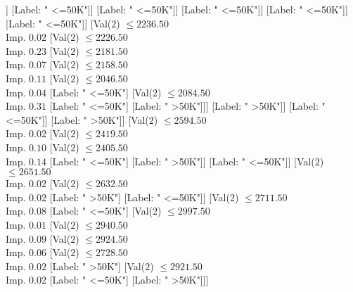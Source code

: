 \documentclass[margin=10pt]{standalone}
\begin{document}
\begin{forest}
																									[Label: " <=50K"]]
																								[Label: " <=50K"]]
																							[Label: " <=50K"]]
																						[Label: " <=50K"]]
																					[Label: " <=50K"]]
																				[Label: " <=50K"]]
																			[Val($2$) $ \leq 2236.50$ \\ Imp. $0.02$
																				[Val($2$) $ \leq 2226.50$ \\ Imp. $0.23$
																					[Val($2$) $ \leq 2181.50$ \\ Imp. $0.07$
																						[Val($2$) $ \leq 2158.50$ \\ Imp. $0.11$
																							[Val($2$) $ \leq 2046.50$ \\ Imp. $0.04$
																								[Label: " <=50K"]
																								[Val($2$) $ \leq 2084.50$ \\ Imp. $0.31$
																									[Label: " <=50K"]
																									[Label: " >50K"]]]
																							[Label: " >50K"]]
																						[Label: " <=50K"]]
																					[Label: " >50K"]]
																				[Val($2$) $ \leq 2594.50$ \\ Imp. $0.02$
																					[Val($2$) $ \leq 2419.50$ \\ Imp. $0.10$
																						[Val($2$) $ \leq 2405.50$ \\ Imp. $0.14$
																							[Label: " <=50K"]
																							[Label: " >50K"]]
																						[Label: " <=50K"]]
																					[Val($2$) $ \leq 2651.50$ \\ Imp. $0.02$
																						[Val($2$) $ \leq 2632.50$ \\ Imp. $0.02$
																							[Label: " >50K"]
																							[Label: " <=50K"]]
																						[Val($2$) $ \leq 2711.50$ \\ Imp. $0.08$
																							[Label: " <=50K"]
																							[Val($2$) $ \leq 2997.50$ \\ Imp. $0.01$
																								[Val($2$) $ \leq 2940.50$ \\ Imp. $0.09$
																									[Val($2$) $ \leq 2924.50$ \\ Imp. $0.06$
																										[Val($2$) $ \leq 2728.50$ \\ Imp. $0.02$
																											[Label: " >50K"]
																											[Val($2$) $ \leq 2921.50$ \\ Imp. $0.02$
																												[Label: " <=50K"]
																												[Label: " >50K"]]]

\end{forest}
\end{document}
